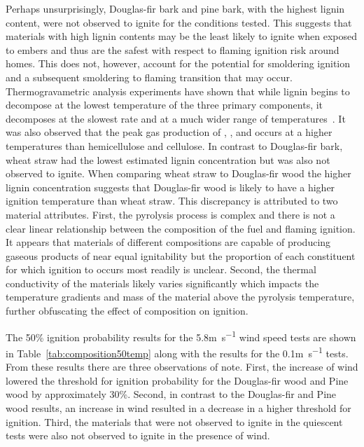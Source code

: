     Perhaps unsurprisingly, Douglas-fir bark and pine bark, with the highest lignin content, were not observed to ignite for the conditions tested. This suggests that materials with high lignin contents may be the least likely to ignite when exposed to embers and thus are the safest with respect to flaming ignition risk around homes. This does not, however, account for the potential for smoldering ignition and a subsequent smoldering to flaming transition that may occur. Thermogravametric analysis experiments have shown that while lignin begins to decompose at the lowest temperature of the three primary components, it decomposes at the slowest rate and at a much wider range of temperatures~\cite{Yang2007a}. It was also observed that the peak gas production of , , and  occurs at a higher temperatures than hemicellulose and cellulose. In contrast to Douglas-fir bark, wheat straw had the lowest estimated lignin concentration but was also not observed to ignite. When comparing wheat straw to Douglas-fir wood the higher lignin concentration suggests that Douglas-fir wood is likely to have a higher ignition temperature than wheat straw. This discrepancy is attributed to two material attributes. First, the pyrolysis process is complex and there is not a clear linear relationship between the composition of the fuel and flaming ignition. It appears that materials of different compositions are capable of producing gaseous products of near equal ignitability but the proportion of each constituent for which ignition to occurs most readily is unclear. Second, the thermal conductivity of the materials likely varies significantly which impacts the temperature gradients and mass of the material above the pyrolysis temperature, further obfuscating the effect of composition on ignition. 
    
    The 50\% ignition probability results for the 5.8\si{\meter\per\second} wind speed tests are shown in Table~\ref{tab:composition50temp} along with the results for the 0.1\si{\meter\per\second} tests. From these results there are three observations of note. First, the increase of wind lowered the threshold for ignition probability for the Douglas-fir wood and Pine wood by approximately 30\%. Second, in contrast to the Douglas-fir and Pine wood results, an increase in wind resulted in a decrease in a higher threshold for ignition.  Third, the materials that were not observed to ignite in the quiescent tests were also not observed to ignite in the presence of wind. 
    
